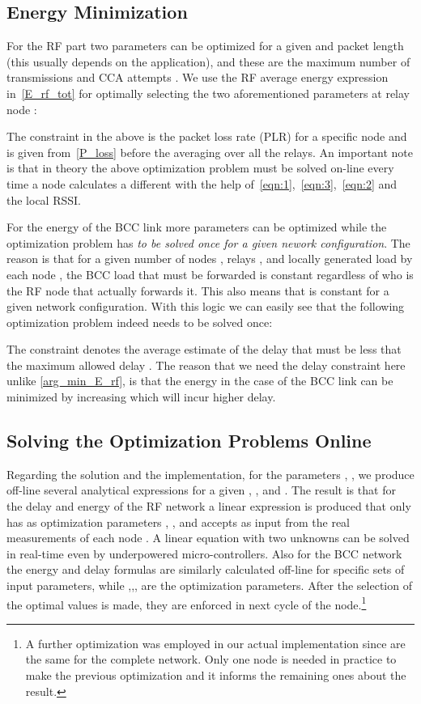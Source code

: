 \documentclass[10pt]{IEEEtran}
\newcounter{section:outage-analysis}
\begin{document}
\subsection{Energy Minimization}
For the RF part two parameters can be optimized for a given  and packet length  (this usually depends on the application), and these are the maximum number of transmissions  and CCA attempts . We use the RF average energy expression in~\eqref{E_rf_tot} for optimally selecting the two aforementioned parameters at relay node :

The constraint in the above is the packet loss rate (PLR) for a specific node  and is given from~\eqref{P_loss} before the averaging over all the relays. An important note is that in theory the above optimization problem must be solved on-line every time a node calculates a different  with the help of~\eqref{eqn:1},~\eqref{eqn:3},~\eqref{eqn:2} and the local RSSI.

For the energy of the BCC link more parameters can be optimized while the optimization problem has \emph{to be solved once for a given nework configuration}. The reason is that for a given number of nodes , relays , and locally generated load by each node , the BCC load  that must be forwarded is constant regardless of who is the RF node that actually forwards it. This also means that  is constant for a given network configuration. With this logic we can easily see that the following optimization problem indeed needs to be solved once:

The constraint denotes the average estimate of the delay that must be less that the maximum allowed delay . The reason that we need the delay constraint here unlike \eqref{arg_min_E_rf}, is that the energy in the case of the BCC link can be minimized by increasing  which will incur higher delay.

\subsection{Solving the Optimization Problems Online}
Regarding the solution and the implementation, for the parameters , , we produce off-line several analytical expressions for a given , , and . The result is that for the delay and energy of the RF network a linear expression is produced that only has as optimization parameters , , and accepts as input  from the real measurements of each node . A linear equation with two unknowns can be solved in real-time even by underpowered micro-controllers. Also for the BCC network the energy and delay formulas are similarly calculated off-line for specific sets of input parameters, while ,,, are the optimization parameters. After the selection of the optimal values is made, they are enforced in next cycle of the node.\footnote{A further optimization was employed in our actual implementation since  are the same for the complete network. Only one node is needed in practice to make the previous optimization and it informs the remaining ones about the result.}
\end{document}
